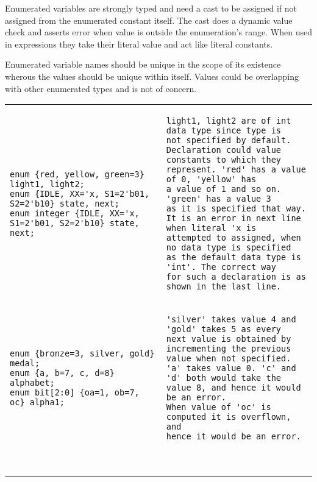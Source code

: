 Enumerated variables are strongly typed and need a cast to be assigned
if not assigned from the enumerated constant itself. The cast does a
dynamic value check and asserts error when value is outside the
enumeration's range. When used in expressions they take their literal
value and act like literal constants.

Enumerated variable names should be unique in the scope of its
existence wherous the values should be unique within itself. Values
could be overlapping with other enumerated types and is not of
concern.

\begin{table}
\begin{tabular}{p{} p{}}

\begin{Verbatim}
enum {red, yellow, green=3} light1, light2;
enum {IDLE, XX='x, S1=2'b01, S2=2'b10} state, next;
enum integer {IDLE, XX='x, S1=2'b01, S2=2'b10} state, next;
\end{Verbatim}
&
\begin{tbldesc}
\begin{verbatim}
light1, light2 are of int data type since type is 
not specified by default.
Declaration could value constants to which they
represent. 'red' has a value of 0, 'yellow' has
a value of 1 and so on. 'green' has a value 3
as it is specified that way.
It is an error in next line when literal 'x is
attempted to assigned, when no data type is specified
as the default data type is 'int'. The correct way
for such a declaration is as shown in the last line.
\end{verbatim}
\end{tbldesc}
\\
\begin{Verbatim}
enum {bronze=3, silver, gold} medal;
enum {a, b=7, c, d=8} alphabet;
enum bit[2:0] {oa=1, ob=7, oc} alpha1;
\end{Verbatim}
&
\begin{tbldesc}
\begin{verbatim}
'silver' takes value 4 and 'gold' takes 5 as every
next value is obtained by incrementing the previous
value when not specified.
'a' takes value 0. 'c' and 'd' both would take the
value 8, and hence it would be an error.
When value of 'oc' is computed it is overflown, and
hence it would be an error.
\end{verbatim}
\end{tbldesc}
\\
\begin{Verbatim}

\end{Verbatim}
\end{tabular}
\end{table}
